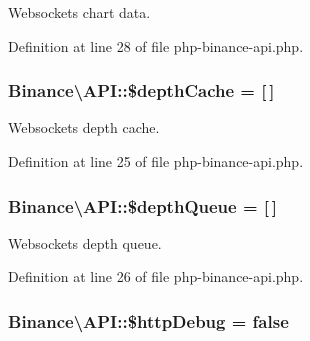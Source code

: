 Websockets chart data. 



Definition at line 28 of file php-\/binance-\/api.\-php.

\hypertarget{classBinance_1_1API_a69d62e886266a59b0a314cb4f5f164ca}{
\subsubsection[{\$depth\-Cache}]{\setlength{\rightskip}{0pt plus 5cm}Binance\textbackslash{}\-A\-P\-I\-::\$depth\-Cache = \mbox{[}$\,$\mbox{]}\hspace{0.3cm}{\ttfamily [protected]}}}\label{classBinance_1_1API_a69d62e886266a59b0a314cb4f5f164ca}


Websockets depth cache. 



Definition at line 25 of file php-\/binance-\/api.\-php.

\hypertarget{classBinance_1_1API_ab04600479e07a4af0ead9ba84772bde1}{
\subsubsection[{\$depth\-Queue}]{\setlength{\rightskip}{0pt plus 5cm}Binance\textbackslash{}\-A\-P\-I\-::\$depth\-Queue = \mbox{[}$\,$\mbox{]}\hspace{0.3cm}{\ttfamily [protected]}}}\label{classBinance_1_1API_ab04600479e07a4af0ead9ba84772bde1}


Websockets depth queue. 



Definition at line 26 of file php-\/binance-\/api.\-php.

\hypertarget{classBinance_1_1API_aaaf9a901342001f8734bfab6ba505205}{
\subsubsection[{\$http\-Debug}]{\setlength{\rightskip}{0pt plus 5cm}Binance\textbackslash{}\-A\-P\-I\-::\$http\-Debug = false}}\label{classBinance_1_1API_aaaf9a901342001f8734bfab6ba505205}


